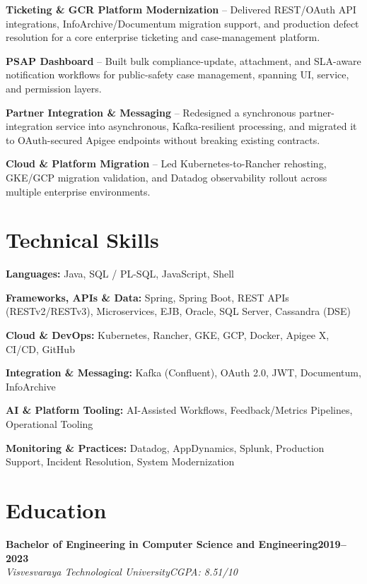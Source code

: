 \documentclass[10pt,a4paper]{article}
\newcommand{\cventry}[4]{%
  \noindent\textbf{#1}\hfill\textbf{#4}\\
  \textit{#2}\hfill\textit{#3}\\[2pt]%
}
\newcommand{\skillrow}[2]{%
  \textbf{#1:} #2 \par\vspace{1pt}%
}
\begin{document}
\vspace{1pt}
\textbf{Ticketing \& GCR Platform Modernization} -- Delivered REST/OAuth API integrations, InfoArchive/Documentum migration support, and production defect resolution for a core enterprise ticketing and case-management platform.

\vspace{1pt}
\textbf{PSAP Dashboard} -- Built bulk compliance-update, attachment, and SLA-aware notification workflows for public-safety case management, spanning UI, service, and permission layers.

\vspace{1pt}
\textbf{Partner Integration \& Messaging} -- Redesigned a synchronous partner-integration service into asynchronous, Kafka-resilient processing, and migrated it to OAuth-secured Apigee endpoints without breaking existing contracts.

\vspace{1pt}
\textbf{Cloud \& Platform Migration} -- Led Kubernetes-to-Rancher rehosting, GKE/GCP migration validation, and Datadog observability rollout across multiple enterprise environments.

\section{Technical Skills}
\skillrow{Languages}{Java, SQL / PL-SQL, JavaScript, Shell}
\skillrow{Frameworks, APIs \& Data}{Spring, Spring Boot, REST APIs (RESTv2/RESTv3), Microservices, EJB, Oracle, SQL Server, Cassandra (DSE)}
\skillrow{Cloud \& DevOps}{Kubernetes, Rancher, GKE, GCP, Docker, Apigee X, CI/CD, GitHub}
\skillrow{Integration \& Messaging}{Kafka (Confluent), OAuth 2.0, JWT, Documentum, InfoArchive}
\skillrow{AI \& Platform Tooling}{AI-Assisted Workflows, Feedback/Metrics Pipelines, Operational Tooling}
\skillrow{Monitoring \& Practices}{Datadog, AppDynamics, Splunk, Production Support, Incident Resolution, System Modernization}

\section{Education}
\cventry{Bachelor of Engineering in Computer Science and Engineering}{Visvesvaraya Technological University}{CGPA: 8.51/10}{2019--2023}
\end{document}
